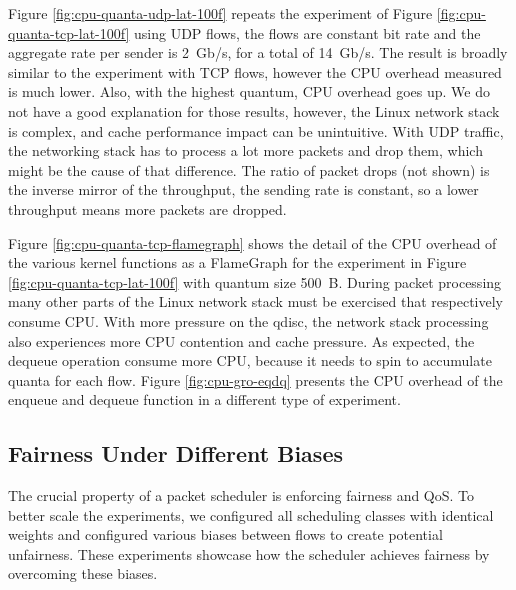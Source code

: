 


Figure \ref{fig:cpu-quanta-udp-lat-100f} repeats the experiment of
Figure \ref{fig:cpu-quanta-tcp-lat-100f} using UDP flows, the flows are
constant bit rate and the aggregate rate per sender is 2~Gb/s, for
a total of 14~Gb/s. The result is broadly similar to the experiment
with TCP flows, however the CPU overhead measured is much lower. Also,
with the highest quantum, CPU overhead goes up. We do not have a good
explanation for those results, however, the Linux network stack is
complex, and cache performance impact can be unintuitive. With UDP
traffic, the networking stack has to process a lot more packets and
drop them, which might be the cause of that difference. The ratio of
packet drops (not shown) is the inverse mirror of the throughput, the
sending rate is constant, so a lower throughput means more packets are
dropped.

Figure \ref{fig:cpu-quanta-tcp-flamegraph} shows the detail of the CPU overhead
of the various kernel functions as a FlameGraph for the experiment in
Figure \ref{fig:cpu-quanta-tcp-lat-100f} with quantum size 500~B. During
packet processing many other parts of the Linux network stack must be
exercised that respectively consume CPU. With more pressure on the
qdisc, the network stack processing also experiences more CPU
contention and cache pressure. As expected, the dequeue operation
consume more CPU, because it needs to spin to accumulate quanta for
each flow. Figure \ref{fig:cpu-gro-eqdq} presents the CPU overhead of the
enqueue and dequeue function in a different type of experiment.




\subsection{Fairness Under Different Biases}
\label{sec:scrr-eval-fairness}

The crucial property of a packet scheduler is enforcing fairness and
QoS. To better scale the
experiments, we configured all scheduling classes with identical
weights and configured various biases between flows to create
potential unfairness. These experiments showcase how the scheduler
achieves fairness by overcoming these biases.

